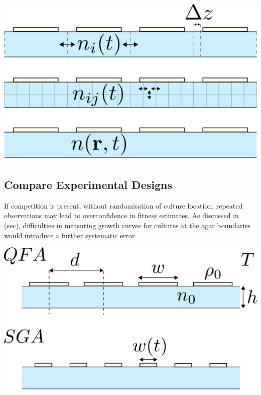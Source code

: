 \begin{Figure}
  \centering
  \includegraphics[width=\linewidth]{height_dep_miniqfa_delta_z}
  \label{fig:height_dependence}
\end{Figure}
\subsection{Compare Experimental Designs}
\label{sec:comp-exper-designs}

If competition is present, without randomisation of culture location,
repeated observations may lead to overconfidence in fitness
estimates. As discussed in (sec), difficulties in measuring growth curves
for cultures at the agar boundaries would introduce a further
systematic error.

\begin{Figure}
  \centering
  \includegraphics[width=\linewidth]{qfa_v_sga_vars}
  \label{fig:exp_vars}
\end{Figure}






